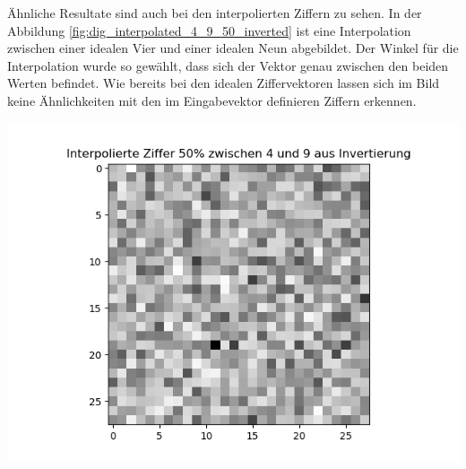 \documentclass[Interploate_hadwritten_Digits.tex]{subfiles}
\begin{document}
	Ähnliche Resultate sind auch bei den interpolierten Ziffern zu sehen. In der Abbildung \ref{fig:dig_interpolated_4_9_50_inverted} ist eine Interpolation zwischen einer idealen Vier und einer idealen Neun abgebildet. Der Winkel für die Interpolation wurde so gewählt, dass sich der Vektor genau zwischen den beiden Werten befindet. Wie bereits bei den idealen Ziffervektoren lassen sich im Bild keine Ähnlichkeiten mit den im Eingabevektor definieren Ziffern erkennen.
	\begin{Figure}
		\centering
		\includegraphics[width=\linewidth]{img/results/interpolated_4_9_50_inverted.png}
		\label{fig:dig_interpolated_4_9_50_inverted}
	\end{Figure}
	
\end{document}
